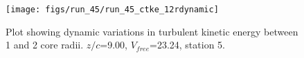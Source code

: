\begin{figure}[H]
\centering
\texttt{[image: figs/run\_45/run\_45\_ctke\_12rdynamic]}
\caption{Plot showing dynamic variations in turbulent kinetic energy between 1 and 2 core radii. $z/c$=9.00, $V_{free}$=23.24, station 5.}
\label{fig:run_45_ctke_12rdynamic}
\end{figure}


